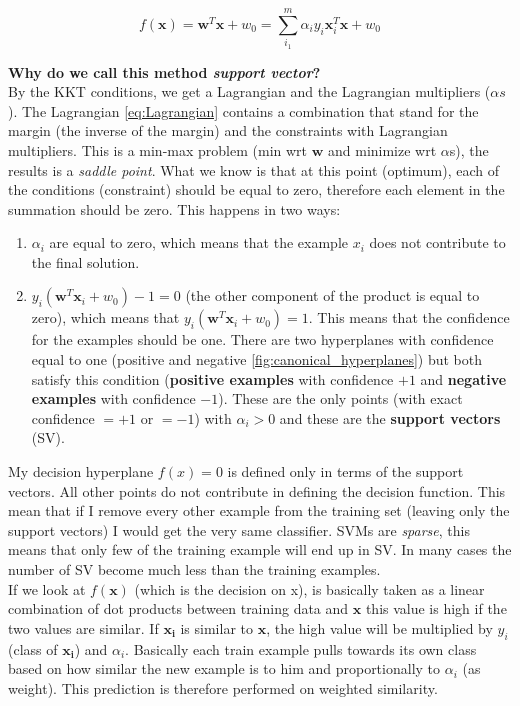             $$f(\pmb{x}) = \pmb{w}^T \pmb{x} + w_0 = \sum_{i_1}^m \alpha_i y_i \pmb{x}_i^T \pmb{x} + w_0$$

            \textbf{Why do we call this method \textit{support vector}?}\\
            By the KKT conditions, we get a Lagrangian and the Lagrangian multipliers ($\alpha s$). The Lagrangian \ref{eq:Lagrangian} contains a combination that stand for the margin (the inverse of the margin) and the constraints with Lagrangian multipliers. 
            This is a min-max problem (min wrt $\pmb{w}$ and minimize wrt $\alpha $s), the results is a \textit{saddle point}. 
            What we know is that at this point (optimum), each of the conditions (constraint) should be equal to zero, therefore each element in the summation should be zero. This happens in two ways:
            \begin{enumerate}
                \item $\alpha_i$ are equal to zero, which means that the example $x_i$ does not contribute to the final solution.
                \item $y_i(\pmb{w}^T \pmb{x}_i + w_0) - 1 = 0$ (the other component of the product is equal to zero), which means that $y_i(\pmb{w}^T \pmb{x}_i + w_0) = 1$. 
                This means that the confidence for the examples should be one. There are two hyperplanes with confidence equal to one (positive and negative \ref{fig:canonical_hyperplanes}) but both satisfy this condition (\textbf{positive examples} with confidence $+1$ and \textbf{negative examples} with confidence $-1$). These are the only points (with exact confidence $=+1$ or $=-1$) with $\alpha_i > 0$ and these are the \textbf{support vectors} (SV).
            \end{enumerate}
            My decision hyperplane $f(x) = 0$ is defined only in terms of the support vectors. 
            All other points do not contribute in defining the decision function. This mean that if I remove every other example from the training set (leaving only the support vectors) I would get the very same classifier.           
            SVMs are \textit{sparse}, this means that only few of the training example will end up in SV. In many cases the number of SV become much less than the training examples.\\

            If we look at $f(\pmb{x})$ (which is the decision on x), is basically taken as a linear combination of dot products between training data and $\pmb{x}$ this value is high if the two values are similar. 
            If $\pmb{x_i}$ is similar to $\pmb{x}$, the high value will be multiplied by $y_i$ (class of $\pmb{x_i}$) and $\alpha_i$. Basically each train example pulls towards its own class based on how similar the new example is to him and proportionally to $\alpha_i$ (as weight).
            This prediction is therefore performed on weighted similarity.\\

